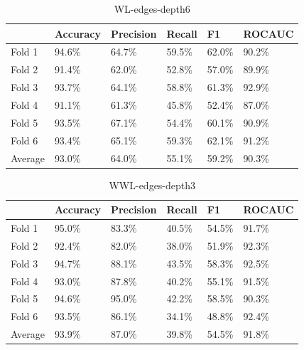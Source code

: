 \documentclass{IEEEtran}
\begin{document}
\begin{table}
    \centering
    \begin{tabular}{l||llll|l}
        \textbf{} & \textbf{Accuracy} & \textbf{Precision} & \textbf{Recall} & \textbf{F1} & \textbf{ROCAUC} \\
        \hline \hline
        Fold 1    & 94.6\%            & 64.7\%             & 59.5\%          & 62.0\%      & 90.2\%          \\
        Fold 2    & 91.4\%            & 62.0\%             & 52.8\%          & 57.0\%      & 89.9\%          \\
        Fold 3    & 93.7\%            & 64.1\%             & 58.8\%          & 61.3\%      & 92.9\%          \\
        Fold 4    & 91.1\%            & 61.3\%             & 45.8\%          & 52.4\%      & 87.0\%          \\
        Fold 5    & 93.5\%            & 67.1\%             & 54.4\%          & 60.1\%      & 90.9\%          \\
        Fold 6    & 93.4\%            & 65.1\%             & 59.3\%          & 62.1\%      & 91.2\%          \\
        \hline
        Average   & 93.0\%            & 64.0\%             & 55.1\%          & 59.2\%      & 90.3\%          \\
    \end{tabular}
    \caption{WL-edges-depth6}
\end{table}


\begin{table}
    \centering
    \begin{tabular}{l||llll|l}
        \textbf{} & \textbf{Accuracy} & \textbf{Precision} & \textbf{Recall} & \textbf{F1} & \textbf{ROCAUC} \\
        \hline \hline
        Fold 1    & 95.0\%            & 83.3\%             & 40.5\%          & 54.5\%      & 91.7\%          \\
        Fold 2    & 92.4\%            & 82.0\%             & 38.0\%          & 51.9\%      & 92.3\%          \\
        Fold 3    & 94.7\%            & 88.1\%             & 43.5\%          & 58.3\%      & 92.5\%          \\
        Fold 4    & 93.0\%            & 87.8\%             & 40.2\%          & 55.1\%      & 91.5\%          \\
        Fold 5    & 94.6\%            & 95.0\%             & 42.2\%          & 58.5\%      & 90.3\%          \\
        Fold 6    & 93.5\%            & 86.1\%             & 34.1\%          & 48.8\%      & 92.4\%          \\
        \hline
        Average   & 93.9\%            & 87.0\%             & 39.8\%          & 54.5\%      & 91.8\%          \\
    \end{tabular}
    \caption{WWL-edges-depth3}
\end{table}
\end{document}
